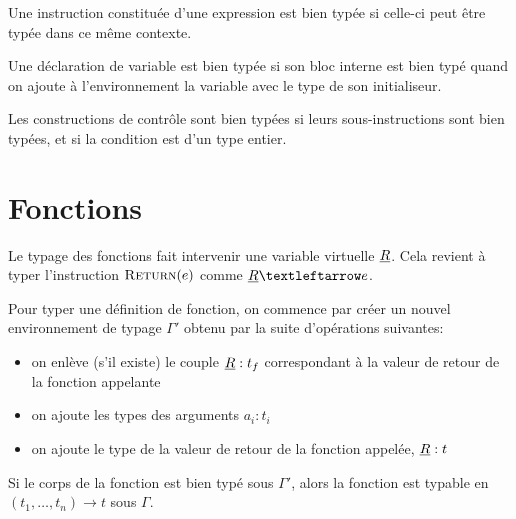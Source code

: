 Une instruction constituée d'une expression est bien typée si celle-ci peut être
typée dans ce même contexte.

\begin{mathpar}
\end{mathpar}

Une déclaration de variable est bien typée si son bloc interne est bien typé
quand on ajoute à l'environnement la variable avec le type de son initialiseur.

\begin{mathpar}
\end{mathpar}

Les constructions de contrôle sont bien typées si leurs sous-instructions sont
bien typées, et si la condition est d'un type entier.

\begin{mathpar}

\end{mathpar}

\section{Fonctions}

Le typage des fonctions fait intervenir une variable virtuelle $\vRet$. Cela
revient à typer l'instruction $\iReturn{e}$ comme $\vRet ← e$.

\begin{mathpar}
\end{mathpar}

Pour typer une définition de fonction, on commence par créer un nouvel
environnement de typage $Γ'$ obtenu par la suite d'opérations suivantes:

\begin{itemize}
\item
  on enlève (s'il existe) le couple $\vRet : t_f$ correspondant à la
  valeur de retour de la fonction appelante
\item
  on ajoute les types des arguments $a_i : t_i$
\item
  on ajoute le type de la valeur de retour de la fonction appelée,
  $\vRet : t$
\end{itemize}

Si le corps de la fonction est bien typé sous $Γ'$, alors la fonction est
typable en $(t_1, …, t_n) → t$ sous $Γ$.

\begin{mathpar}
\end{mathpar}

